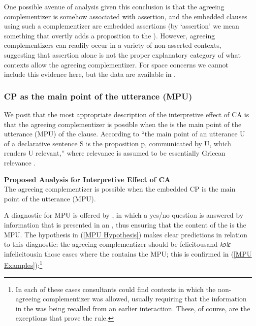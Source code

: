 \documentclass[output=paper
,newtxmath
,modfonts
,nonflat]{langsci/langscibook}
\begin{document}
One possible avenue of analysis given this conclusion is that the agreeing complementizer is somehow associated with assertion, and the embedded clauses using such a complementizer are embedded assertions (by `assertion' we mean something that overtly adds a proposition to the ). However, agreeing complementizers can readily occur in a variety of non-asserted contexts, suggesting that assertion alone is not the proper explanatory category of what contexts allow the agreeing complementizer. For space concerns we cannot include this evidence here, but the data are available in \citealt{Rao:2016a}.

\subsubsection{CP as the main point of the utterance (MPU)}

We posit that the most appropriate description of the interpretive effect of  CA is that the agreeing complementizer is possible when the  is the main point of the utterance (MPU) of the clause. According to \citet{Simons:2007}  ``the main point of an utterance U of a declarative sentence S is the proposition p, communicated by U, which renders U relevant,'' where relevance is assumed to be essentially Gricean relevance \citep{Grice:1975a}. 

\ea \label{MPU Hypothesis}
\textbf{Proposed Analysis for Interpretive Effect of  CA} \\
The agreeing complementizer is possible when the embedded CP is the main point of the utterance (MPU).
\z

A diagnostic for MPU is offered by \citep[1036]{Simons:2007}, in which a yes/no question is answered by   information that is presented in an , thus ensuring that the content of the  is the MPU. The hypothesis in (\ref{MPU Hypothesis}) makes clear predictions in relation to this diagnostic: the agreeing complementizer should be felicitous\textemdash and \textit{kɔlɛ} infelicitous\textemdash in those cases where the  contains the MPU; this is confirmed in (\ref{MPU Examples}):\footnote{In each of these cases consultants could find contexts in which the non-agreeing complementizer was allowed, usually requiring that the information in the  was being recalled from an earlier interaction. These, of course, are the exceptions that prove the rule.}  
\end{document}
